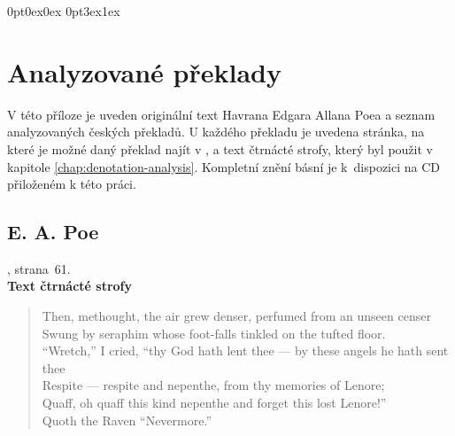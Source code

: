 \documentclass[dp.tex]{subfiles}
\begin{document}
\titleformat{\chapter}[display]
  {\normalfont\huge\bfseries}{\chaptertitlename\ \thechapter}{20pt}{\Huge}
\titlespacing*{\chapter}
{0pt}{0ex}{0ex}
\titlespacing*{\section}
{0pt}{3ex}{1ex}


\chapter{Analyzované překlady}
\label{appendix:preklady}

V této příloze je uveden originální text Havrana Edgara Allana Poea a seznam analyzovaných českých překladů. U každého překladu je uvedena stránka, na které je možné daný překlad najít v \cite{Poe1990}, a text čtrnácté strofy, který byl použit v kapitole \ref{chap:denotation-analysis}. Kompletní znění básní je k~dispozici na CD přiloženém k této práci.

\section*{E. A. Poe}

, strana~61.
\\\textbf{Text čtrnácté strofy}
\begin{verse}
Then, methought, the air grew denser, perfumed from an unseen censer\\
Swung by seraphim whose foot-falls tinkled on the tufted floor.\\
“Wretch,” I cried, “thy God hath lent thee — by these angels he hath sent thee\\
Respite — respite and nepenthe, from thy memories of Lenore;\\
Quaff, oh quaff this kind nepenthe and forget this lost Lenore!”\\
\hspace*{0.8cm}Quoth the Raven “Nevermore.”
\end{verse}
\end{document}
